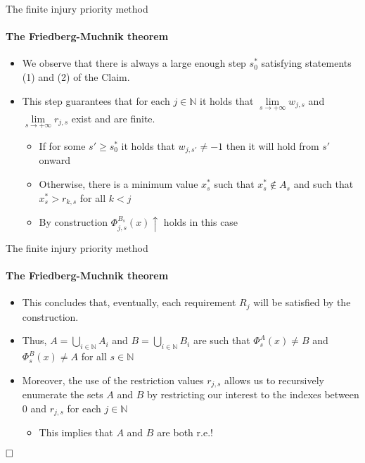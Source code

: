 \documentclass{beamer}
\newcommand{\N}{\mathbb{N}}                     %
\begin{document}
\begin{frame}{The finite injury priority method}
\framesubtitle{The Friedberg-Muchnik theorem}

    \begin{itemize}
        \item We observe that there is always a large enough step $s_0^*$ satisfying statements (1) and (2) of the Claim.
        
        \item This step guarantees that for each $j \in \N$ it holds that $\lim\limits_{s \to +\infty} w_{j,s}$ and $\lim\limits_{s \to +\infty} r_{j,s}$ exist and are finite.
        \begin{itemize}
            \item If for some $s' \geq s_0^*$ it holds that $w_{j,s'} \neq -1$ then it will hold from $s'$ onward
            \item Otherwise, there is a minimum value $x_s^*$ such that $x_s^* \notin A_s$ and such that $x_s^* > r_{k,s}$ for all $k < j$
            \item By construction $\Phi_{j,s}^{B_s}(x) \uparrow$ holds in this case
        \end{itemize}
    \end{itemize}

\end{frame}


\begin{frame}{The finite injury priority method}
\framesubtitle{The Friedberg-Muchnik theorem}

    \begin{itemize}[<+->]
        \item This concludes that, eventually, each requirement $R_j$ will be satisfied by the construction.
        \item Thus, $A = \bigcup\limits_{i \in \N} A_i$ and $B = \bigcup\limits_{i \in \N} B_i$ are such that $\Phi_s^A(x) \neq B$ and $\Phi_s^B(x) \neq A$ for all $s \in \N$
        \item Moreover, the use of the restriction values $r_{j,s}$ allows us to recursively enumerate the sets $A$ and $B$ by restricting our interest to the indexes between $0$ and $r_{j,s}$ for each $j \in \N$
        \begin{itemize}
            \item This implies that $A$ and $B$ are both r.e.!
        \end{itemize}
    \end{itemize}

    $\hfill \square$

\end{frame}
\end{document}
